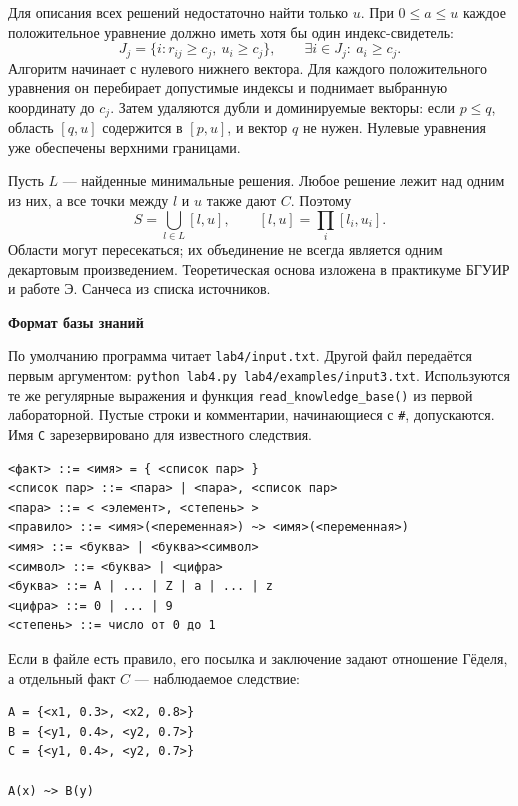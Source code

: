 \documentclass[14pt,a4paper]{extarticle}
\newcommand{\reportheading}[1]{\par\vspace{0.8\baselineskip}\noindent\textbf{#1}\par\nobreak\vspace{0.35\baselineskip}\nobreak}
\begin{document}
Для описания всех решений недостаточно найти только $u$. При $0\leq a\leq u$ каждое положительное уравнение должно иметь хотя бы один индекс-свидетель:
\[
 J_j=\{i:r_{ij}\geq c_j,\ u_i\geq c_j\},\qquad
 \exists i\in J_j:\ a_i\geq c_j.
\]
Алгоритм начинает с нулевого нижнего вектора. Для каждого положительного уравнения он перебирает допустимые индексы и поднимает выбранную координату до $c_j$. Затем удаляются дубли и доминируемые векторы: если $p\leq q$, область $[q,u]$ содержится в $[p,u]$, и вектор $q$ не нужен. Нулевые уравнения уже обеспечены верхними границами.

Пусть $L$ --- найденные минимальные решения. Любое решение лежит над одним из них, а все точки между $l$ и $u$ также дают $C$. Поэтому
\begin{equation}
 S=\bigcup_{l\in L}[l,u],\qquad [l,u]=\prod_i[l_i,u_i].
 \label{eq:all}
\end{equation}
Области могут пересекаться; их объединение не всегда является одним декартовым произведением. Теоретическая основа изложена в практикуме БГУИР и работе Э. Санчеса из списка источников.

\reportheading{Формат базы знаний}
По умолчанию программа читает \texttt{lab4/input.txt}. Другой файл передаётся первым аргументом: \texttt{python lab4.py lab4/examples/input3.txt}. Используются те же регулярные выражения и функция \texttt{read\_knowledge\_base()} из первой лабораторной. Пустые строки и комментарии, начинающиеся с \texttt{\#}, допускаются. Имя \texttt{C} зарезервировано для известного следствия.

\begin{Verbatim}[fontsize=\small,frame=single,breaklines=true]
<факт> ::= <имя> = { <список пар> }
<список пар> ::= <пара> | <пара>, <список пар>
<пара> ::= < <элемент>, <степень> >
<правило> ::= <имя>(<переменная>) ~> <имя>(<переменная>)
<имя> ::= <буква> | <буква><символ>
<символ> ::= <буква> | <цифра>
<буква> ::= A | ... | Z | a | ... | z
<цифра> ::= 0 | ... | 9
<степень> ::= число от 0 до 1
\end{Verbatim}

Если в файле есть правило, его посылка и заключение задают отношение Гёделя, а отдельный факт $C$ --- наблюдаемое следствие:
\begin{Verbatim}[fontsize=\small,frame=single,breaklines=true]
A = {<x1, 0.3>, <x2, 0.8>}
B = {<y1, 0.4>, <y2, 0.7>}
C = {<y1, 0.4>, <y2, 0.7>}

A(x) ~> B(y)
\end{Verbatim}
\end{document}
